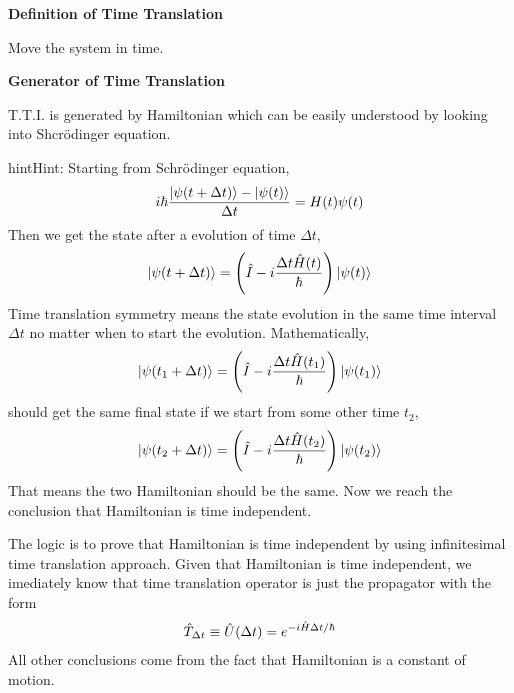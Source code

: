 \documentclass[letterpaper,10pt,english]{sphinxmanual}
\newcommand{\ket}[1]{\left| #1\right\rangle}
\begin{document}
\textbf{Definition of Time Translation}

Move the system in time.

\textbf{Generator of Time Translation}

T.T.I. is generated by Hamiltonian which can be easily understood by looking into Shcrödinger equation.

\begin{notice}{hint}{Hint:}
Starting from Schrödinger equation,
\begin{gather}
\begin{split}i\hbar \frac{\ket{\psi(t+\Delta t)} - \ket{\psi(t)}}{\Delta t} = H(t)\psi(t)\end{split}\notag
\end{gather}
Then we get the state after a evolution of time \(\Delta t\),
\begin{gather}
\begin{split}\ket{\psi(t+\Delta t)} = \left( \hat I - i\frac{\Delta t \hat H(t)}{\hbar} \right) \ket{\psi(t)}\end{split}\notag
\end{gather}
Time translation symmetry means the state evolution in the same time interval \(\Delta t\) no matter when to start the evolution. Mathematically,
\begin{gather}
\begin{split}\ket{\psi(t_1 +\Delta t)} = \left( \hat I - i\frac{\Delta t \hat H(t_1)}{\hbar} \right) \ket{\psi(t_1)}\end{split}\notag
\end{gather}
should get the same final state if we start from some other time \(t_2\),
\begin{gather}
\begin{split}\ket{\psi(t_2 +\Delta t)} = \left( \hat I - i\frac{\Delta t \hat H(t_2)}{\hbar} \right) \ket{\psi(t_2)}\end{split}\notag
\end{gather}
That means the two Hamiltonian should be the same. Now we reach the conclusion that Hamiltonian is time independent.
\end{notice}

The logic is to prove that Hamiltonian is time independent by using infinitesimal time translation approach. Given that Hamiltonian is time independent, we imediately know that time translation operator is just the propagator with the form
\begin{gather}
\begin{split}\hat T_{\Delta t} \equiv \hat U(\Delta t) = e^{-i \hat H \Delta t /\hbar}\end{split}\notag
\end{gather}
All other conclusions come from the fact that Hamiltonian is a constant of motion.
\end{document}
